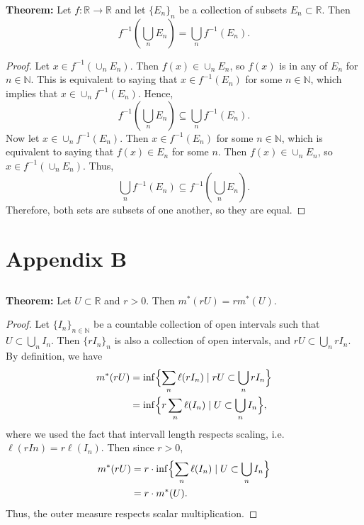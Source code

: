 \documentclass{article}
\begin{document}
\begin{appendices}
\textbf{Theorem:} Let $f:\mathbb{R} \rightarrow \mathbb{R}$ and let $\{E_n\}_n$ be a collection of subsets $E_n \subset \mathbb{R}$. Then
\begin{equation}
	f^{-1}\left(\bigcup_n E_n\right) = \bigcup_n f^{-1}(E_n).
\end{equation}
\begin{proof}
	Let $x \in f^{-1}\left(\cup_n E_n\right)$. Then $f(x) \in \cup_n E_n$, so $f(x)$ is in any of $E_n$ for $n\in\mathbb{N}$. This is equivalent to saying that $x \in f^{-1}(E_n)$ for some $n \in \mathbb{N}$, which implies that $x \in \cup_n f^{-1}(E_n)$. Hence,
	\begin{equation}
		f^{-1}\left(\bigcup_n E_n\right) \subseteq \bigcup_n f^{-1}(E_n).
	\end{equation}
	Now let $x \in \cup_n f^{-1}(E_n)$. Then $x \in f^{-1}(E_n)$ for some $n \in \mathbb{N}$, which is equivalent to saying that $f(x) \in E_n$ for some $n$. Then $f(x) \in \cup_n E_n$, so $x \in f^{-1}\left(\cup_n E_n\right)$. Thus, 
	\begin{equation}
		\bigcup_n f^{-1}(E_n) \subseteq f^{-1}\left(\bigcup_n E_n\right).
	\end{equation}
	Therefore, both sets are subsets of one another, so they are equal.
\end{proof}
\section{Appendix B}
\subsection{}
\label{appendix:B.1}

\textbf{Theorem:} Let $U \subset \mathbb{R}$ and $r > 0$. Then $m^*(rU) = rm^*(U)$. 
\begin{proof}
	Let $\{I_n\}_{n \in \mathbb{N}}$ be a countable collection of open intervals such that \\$U \subset \bigcup_n I_n$. Then $\{rI_n\}_n$ is also a collection of open intervals, and $rU \subset \bigcup_n rI_n$. By definition, we have
	\begin{align}
		m^*(rU) &= \inf \Bigl\{\sum_n \ell(rI_n) \;|\; rU \subset \bigcup_n rI_n\Bigr\} \\
		&= \inf \Bigl\{r\sum_n \ell(I_n) \;|\; U\subset \bigcup_n I_n\Bigr\},
	\end{align}
	where we used the fact that intervall length respects scaling, i.e. $\ell(rIn) = r\ell(I_n)$. Then since $r > 0$, 
	\begin{align}
		m^*(rU) &= r \cdot \inf \Bigl\{\sum_n \ell(I_n) \;|\; U\subset \bigcup_n I_n\Bigr\} \\
		&= r \cdot m^*(U).
	\end{align}
	Thus, the outer measure respects scalar multiplication. 
\end{proof}

\end{appendices}
	
\end{document}
